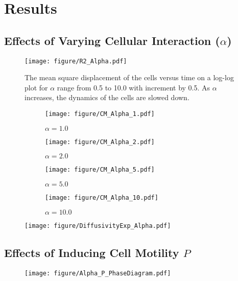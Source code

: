 \documentclass[a4paper,12pt]{article}
\begin{document}
\pagebreak
\section{Results}

\subsection{Effects of Varying Cellular Interaction ($\alpha$)}
\begin{figure}[h]
\centering
\texttt{[image: figure/R2\_Alpha.pdf]}
\caption{The mean square displacement of the cells versus time on a log-log plot for $\alpha$ range from 0.5 to 10.0 with increment by 0.5. As $\alpha$ increases, the dynamics of the cells are slowed down.}
\label{fig:r2alpha}
\end{figure}


\begin{figure}[h]
\centering
\begin{subfigure}[h]{0.49\textwidth}
\texttt{[image: figure/CM\_Alpha\_1.pdf]}
\caption*{$\alpha = 1.0$}
\end{subfigure}
\begin{subfigure}[h]{0.49\textwidth}
\texttt{[image: figure/CM\_Alpha\_2.pdf]}
\caption*{$\alpha = 2.0$}
\end{subfigure}
\begin{subfigure}[h]{0.49\textwidth}
\texttt{[image: figure/CM\_Alpha\_5.pdf]}
\caption*{$\alpha = 5.0$}
\end{subfigure}
\begin{subfigure}[h]{0.49\textwidth}
\texttt{[image: figure/CM\_Alpha\_10.pdf]}
\caption*{$\alpha = 10.0$}
\end{subfigure}
\caption{}
\end{figure}
\FloatBarrier

\begin{figure}[h]
\centering
\texttt{[image: figure/DiffusivityExp\_Alpha.pdf]}
\caption{}
\end{figure}
\FloatBarrier

\subsection{Effects of Inducing Cell Motility $P$}

\begin{figure}[h]
\centering
\texttt{[image: figure/Alpha\_P\_PhaseDiagram.pdf]}
\caption{}
\end{figure}
\FloatBarrier
\end{document}
